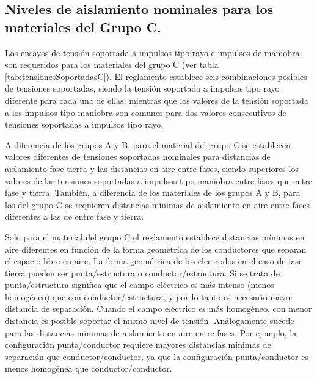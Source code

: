         \subsection{Niveles de aislamiento nominales para los materiales del Grupo C.}
            Los ensayos de tensión soportada a impulsos tipo rayo e impulsos de maniobra son requeridos para los materiales del grupo C (ver tabla \ref{tab:tensionesSoportadasC}). El reglamento establece seis combinaciones posibles de tensiones soportadas, siendo la tensión soportada a impulsos tipo rayo diferente para cada una de ellas, mientras que los valores de la tensión soportada a los impulsos tipo maniobra son comunes para dos valores consecutivos de tensiones soportadas a impulsos tipo rayo.\newline
            
            A diferencia de los grupos A y B, para el material del grupo C se establecen valores diferentes de tensiones soportadas nominales para distancias de aislamiento fase-tierra y las distancias en aire entre fases, siendo superiores los valores de las tensiones soportadas a impulsos tipo maniobra entre fases que entre fase y tierra. También, a diferencia de los materiales de los grupos A y B, para los del grupo C se requieren distancias mínimas de aislamiento en aire entre fases diferentes a las de entre fase y tierra.\newline
            
            Solo para el material del grupo C el reglamento establece distancias mínimas en aire diferentes en función de la forma geométrica de los conductores que separan el espacio libre en aire. La forma geométrica de los electrodos en el caso de fase tierra pueden ser punta/estructura o conductor/estructura. Si se trata de punta/estructura significa que el campo eléctrico es más intenso (menos homogéneo) que con conductor/estructura, y por lo tanto es necesario mayor distancia de separación. Cuando el campo eléctrico es más homogéneo, con menor distancia es posible soportar el mismo nivel de tensión. Análogamente sucede para las distancias mínimas de aislamiento en aire entre fases. Por ejemplo, la configuración punta/conductor requiere mayores distancias mínimas de separación que conductor/conductor, ya que la configuración punta/conductor es menos homogénea que conductor/conductor.\newline

